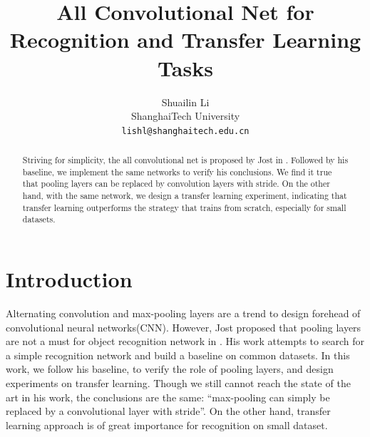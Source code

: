 \documentclass[10pt,twocolumn,letterpaper]{article}
\begin{document}
\title{All Convolutional Net for Recognition and Transfer Learning Tasks}

\author{Shuailin Li\\
ShanghaiTech University\\
{\tt\small lishl@shanghaitech.edu.cn}
\and
}

\maketitle

\begin{abstract}
   Striving for simplicity, the all convolutional net is proposed by Jost
    in \cite{striving}. Followed by his baseline, we implement the same networks to verify
     his conclusions. We find it true that pooling layers can be replaced by 
     convolution layers with stride. On the other hand, with the same network, 
     we design a transfer learning experiment, indicating that transfer learning 
     outperforms the strategy that trains from scratch, especially for small datasets.
\end{abstract}

\section{Introduction}
Alternating convolution and max-pooling layers are a trend to design forehead of convolutional neural networks(CNN). However, Jost proposed that pooling layers are not a must for object recognition network in \cite{striving}. His work attempts to search for a simple recognition network and build a baseline on common datasets. In this work, we follow his baseline, to verify the role of pooling layers, and design experiments on transfer learning. Though we still cannot reach the state of the art in his work, the conclusions are the same: “max-pooling can simply be replaced by a convolutional layer with stride”. On the other hand, transfer learning approach is of great importance for recognition on small dataset.
\end{document}
